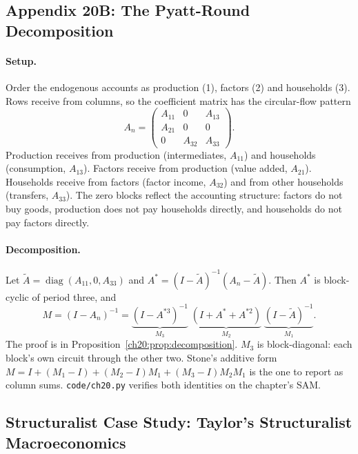 \documentclass[../structural_economics_book.tex]{subfiles}
\begin{document}
\subsection*{Appendix 20B: The Pyatt-Round Decomposition}
\label{ch20:app:pyatt_round}

\paragraph{Setup.} Order the endogenous accounts as production (1), factors (2) and households (3). Rows receive from columns, so the coefficient matrix has the circular-flow pattern
\begin{equation}
A_n = \begin{pmatrix} A_{11} & 0 & A_{13} \\ A_{21} & 0 & 0 \\ 0 & A_{32} & A_{33} \end{pmatrix}.
\end{equation}
Production receives from production (intermediates, $A_{11}$) and households (consumption, $A_{13}$). Factors receive from production (value added, $A_{21}$). Households receive from factors (factor income, $A_{32}$) and from other households (transfers, $A_{33}$). The zero blocks reflect the accounting structure: factors do not buy goods, production does not pay households directly, and households do not pay factors directly.

\paragraph{Decomposition.} Let $\tilde A = \operatorname{diag}(A_{11}, 0, A_{33})$ and $A^* = (I - \tilde A)^{-1}(A_n - \tilde A)$. Then $A^*$ is block-cyclic of period three, and
\[
M = (I - A_n)^{-1} = \underbrace{(I - A^{*3})^{-1}}_{M_3}\;\underbrace{(I + A^* + A^{*2})}_{M_2}\;\underbrace{(I - \tilde A)^{-1}}_{M_1}.
\]
The proof is in Proposition~\ref{ch20:prop:decomposition}. $M_3$ is block-diagonal: each block's own circuit through the other two. Stone's additive form $M = I + (M_1 - I) + (M_2 - I)M_1 + (M_3 - I)M_2M_1$ is the one to report as column sums. \texttt{code/ch20.py} verifies both identities on the chapter's SAM.


\subsection*{Structuralist Case Study: Taylor's Structuralist Macroeconomics}
\end{document}
